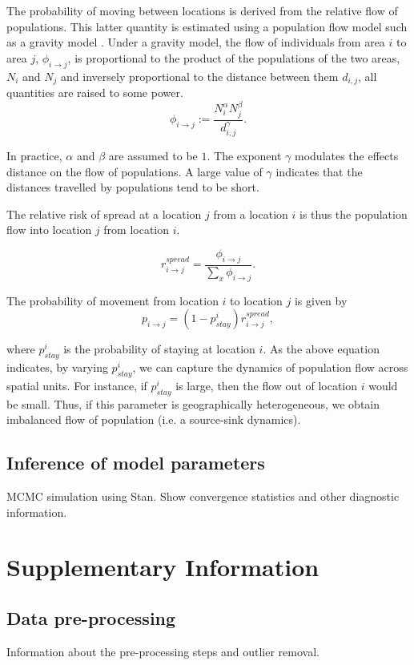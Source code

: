 \documentclass[a4paper,12pt]{article}
\begin{document}
The probability of moving between locations is derived from the
relative flow of populations.
This latter quantity is estimated using a population flow
model such as a gravity model \citep{grosche2007175}. Under a gravity model, the flow of individuals from area \(i\) to area \(j\),
\(\phi_{i \rightarrow j}\), is proportional to the product of the
populations of the two areas, \(N_i\) and \(N_j\) and inversely
proportional to the distance between them \(d_{i, j}\), all quantities
are raised to some power.
\[
  \phi_{i \rightarrow j} :=  \frac{N_i^{\alpha}N_j^{\beta}}{d_{i, j}^{\gamma}}.
\]

In practice, \( \alpha \) and \( \beta \) are assumed to be $1$. The
exponent \( \gamma \) modulates the effects distance on the flow of
populations. A large value of \( \gamma \) indicates that the
distances travelled by populations tend to be short.

The relative risk of spread at a location \(j\) from a location \(i\)
is thus the population flow into location \(j\) from location \(i\).

\[
  r_{i \rightarrow j}^{spread} = \frac{\phi_{i \rightarrow
  j}}{\sum_{x}{\phi_{i \rightarrow
  j}}}.
\]

The probability of movement from location \(i\) to location \(j\) is given by
\[  p_{i \rightarrow j} = (1 - p_{stay}^i) r_{i \rightarrow j}^{spread},\]

where \(p_{stay}^i\) is the probability of staying at location
\(i\). As the above equation indicates, by varying $p_{stay}^i$, we
can capture the dynamics of population flow across spatial units. For
instance, if \(p_{stay}^i\) is large, then the flow out of location
\(i\) would be small. Thus, if this parameter is geographically
heterogeneous, we obtain imbalanced flow of population (i.e. a source-sink dynamics). 

\subsection*{Inference of model parameters}

MCMC simulation using Stan.
Show convergence statistics and other diagnostic information.

\section*{Supplementary Information}
\subsection*{Data pre-processing}
Information about the pre-processing steps and outlier removal.
\end{document}
